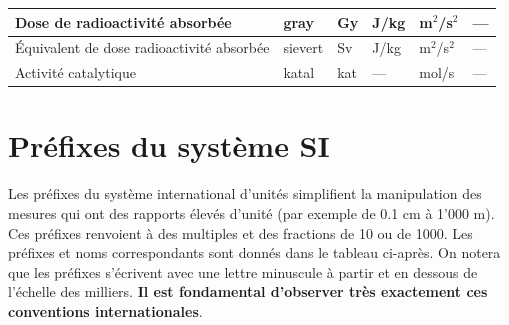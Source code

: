 \begin{center}
\begin{tabular}[t]{>{\pbs\raggedright}p{28mm}
        >{\pbs\centering}p{17mm}
        >{\pbs\centering}p{11mm}
        >{\pbs\centering}p{22mm}
        >{\pbs\centering}p{22mm}
        >{\pbs\raggedright}p{32mm}}
        \\ \hline
        Dose de radioactivité absorbée                          & gray          & Gy          & J/kg      & m$^2$/s$^2$          & ---
        \\ \hline
        Équivalent de dose radioactivité absorbée               & sievert       & Sv          & J/kg      & m$^2$/s$^2$          & ---
        \\ \hline
        Activité catalytique                                    & katal         & kat         & ---       & mol/s                & ---
        \\ \hline\hline
    \end{tabular}
\end{center}


\section{Préfixes du système SI}


Les préfixes du système international d'unités simplifient la manipulation des mesures qui ont des rapports élevés d'unité (par exemple de 0.1 cm à 1'000 m). Ces préfixes renvoient à des multiples et des fractions de 10 ou de 1000.  Les préfixes et noms correspondants sont donnés dans le tableau ci-après. On notera que les préfixes s'écrivent avec une lettre minuscule à partir et en dessous de l'échelle des milliers. \textbf{Il est fondamental d'observer très exactement ces conventions internationales}.

